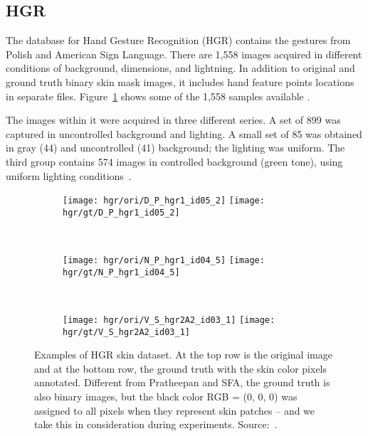 \subsection{HGR}
\label{sec:datasets_hgr}
The database for Hand Gesture Recognition (HGR) contains the gestures from Polish and American Sign Language. There are 1,558 images acquired in different conditions of background, dimensions, and lightning. In addition to original and ground truth binary skin mask images, it includes hand feature points locations in separate files. Figure~\ref{fig:hgr_dataset_exemplo} shows some of the 1,558 samples available \citep{kawulok:14, nalepa:14, grzejszczak:16}.

The images within it were acquired in three different series. A set of 899 was captured in uncontrolled background and lighting. A small set of 85 was obtained in gray (44) and uncontrolled (41) background; the lighting was uniform. The third group contains 574 images in controlled background (green tone), using uniform lighting conditions~\citep{kawulok:14, nalepa:14, grzejszczak:16}.

\begin{figure}[H]
    \centering
    \begin{subfigure}[t]{0.3\textwidth}
        \texttt{[image: hgr/ori/D\_P\_hgr1\_id05\_2]}
        \texttt{[image: hgr/gt/D\_P\_hgr1\_id05\_2]}
    \end{subfigure}
    ~
    \begin{subfigure}[t]{0.275\textwidth}
        \texttt{[image: hgr/ori/N\_P\_hgr1\_id04\_5]}
        \texttt{[image: hgr/gt/N\_P\_hgr1\_id04\_5]}
    \end{subfigure}
    ~
    \begin{subfigure}[t]{0.337\textwidth}
        \texttt{[image: hgr/ori/V\_S\_hgr2A2\_id03\_1]}
        \texttt{[image: hgr/gt/V\_S\_hgr2A2\_id03\_1]}
    \end{subfigure}
    \caption[Examples of HGR skin dataset]{Examples of HGR skin dataset. At the top row is the original image and at the bottom row, the ground truth with the skin color pixels annotated. Different from Pratheepan and SFA, the ground truth is also binary images, but the black color RGB = (0, 0, 0) was assigned to all pixels when they represent skin patches -- and we take this in consideration during experiments. Source:~\citet{kawulok:14, nalepa:14, grzejszczak:16}.}
    \label{fig:hgr_dataset_exemplo}
\end{figure}


